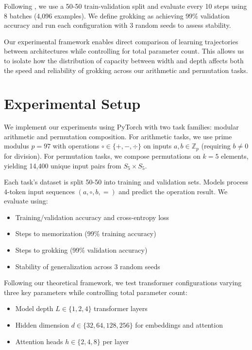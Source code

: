 \documentclass{article} %
\begin{document}
Following \citet{power2022grokking}, we use a 50-50 train-validation split and evaluate every 10 steps using 8 batches (4,096 examples). We define grokking as achieving 99\% validation accuracy and run each configuration with 3 random seeds to assess stability.

Our experimental framework enables direct comparison of learning trajectories between architectures while controlling for total parameter count. This allows us to isolate how the distribution of capacity between width and depth affects both the speed and reliability of grokking across our arithmetic and permutation tasks.

\section{Experimental Setup}
\label{sec:experimental}

We implement our experiments using PyTorch \citep{paszke2019pytorch} with two task families: modular arithmetic and permutation composition. For arithmetic tasks, we use prime modulus $p=97$ with operations $\circ \in \{+, -, \div\}$ on inputs $a,b \in \mathbb{Z}_p$ (requiring $b \neq 0$ for division). For permutation tasks, we compose permutations on $k=5$ elements, yielding 14,400 unique input pairs from $S_5 \times S_5$.

Each task's dataset is split 50-50 into training and validation sets. Models process 4-token input sequences $(a, \circ, b, =)$ and predict the operation result. We evaluate using:
\begin{itemize}
    \item Training/validation accuracy and cross-entropy loss
    \item Steps to memorization (99\% training accuracy)
    \item Steps to grokking (99\% validation accuracy)
    \item Stability of generalization across 3 random seeds
\end{itemize}

Following our theoretical framework, we test transformer configurations varying three key parameters while controlling total parameter count:
\begin{itemize}
    \item Model depth $L \in \{1,2,4\}$ transformer layers
    \item Hidden dimension $d \in \{32,64,128,256\}$ for embeddings and attention
    \item Attention heads $h \in \{2,4,8\}$ per layer
\end{itemize}
\end{document}
